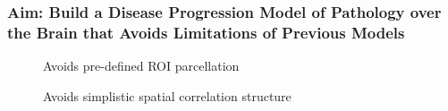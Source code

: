 \begin{frame}
\frametitle{Aim: Build a Disease Progression Model of Pathology over the Brain that Avoids Limitations of Previous Models}


\newcommand{\aimImgScale}{0.8}
\newcommand{\mnpHeight}{3cm}

\vspace{-2em}

\begin{figure}[h]
  \centering
  \begin{minipage}[t][\mnpHeight][t]{0.3\textwidth}
   \centering
   Avoids pre-defined ROI parcellation\\
  \end{minipage}
   \begin{minipage}[t][\mnpHeight][t]{0.3\textwidth}
  \centering
  Avoids simplistic spatial correlation structure\\
  \vspace{0.5em}

\end{minipage}
\end{figure}
\end{frame}
